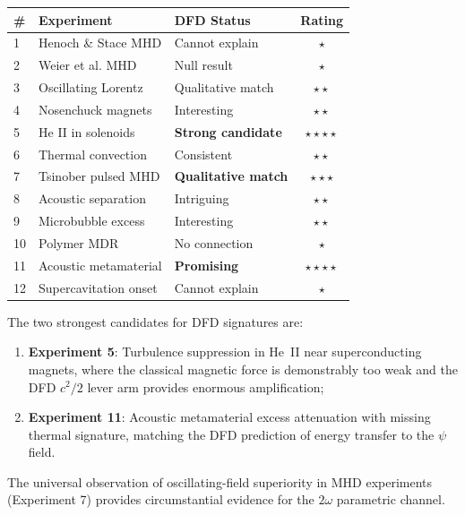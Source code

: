 \documentclass[12pt,twocolumn]{article}
\begin{document}
\begin{center}
\small
\begin{tabular}{@{}p{0.6cm}p{3cm}p{2.5cm}c@{}}
\toprule
\textbf{\#} & \textbf{Experiment} & \textbf{DFD Status} & \textbf{Rating} \\
\midrule
1 & Henoch \& Stace MHD & Cannot explain & $\star$ \\
2 & Weier et al. MHD & Null result & $\star$ \\
3 & Oscillating Lorentz & Qualitative match & $\star\star$ \\
4 & Nosenchuck magnets & Interesting & $\star\star$ \\
5 & He II in solenoids & \textbf{Strong candidate} & $\star\star\star\star$ \\
6 & Thermal convection & Consistent & $\star\star$ \\
7 & Tsinober pulsed MHD & \textbf{Qualitative match} & $\star\star\star$ \\
8 & Acoustic separation & Intriguing & $\star\star$ \\
9 & Microbubble excess & Interesting & $\star\star$ \\
10 & Polymer MDR & No connection & $\star$ \\
11 & Acoustic metamaterial & \textbf{Promising} & $\star\star\star\star$ \\
12 & Supercavitation onset & Cannot explain & $\star$ \\
\bottomrule
\end{tabular}
\end{center}

The two strongest candidates for DFD signatures are:
\begin{enumerate}[noitemsep]
\item \textbf{Experiment 5}: Turbulence suppression in He~II near
  superconducting magnets, where the classical magnetic force is
  demonstrably too weak and the DFD $c^2/2$ lever arm provides enormous
  amplification;
\item \textbf{Experiment 11}: Acoustic metamaterial excess attenuation
  with missing thermal signature, matching the DFD prediction of
  energy transfer to the $\psi$ field.
\end{enumerate}

The universal observation of oscillating-field superiority in MHD
experiments (Experiment 7) provides circumstantial evidence for the
$2\omega$ parametric channel.

\end{document}
